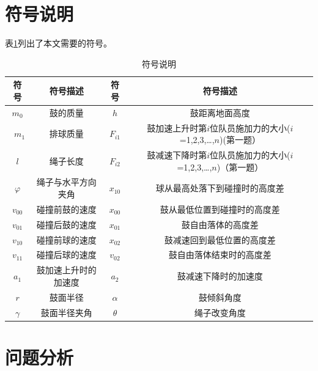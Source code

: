 \documentclass{cumcm}
\begin{document}
\section{符号说明}
表\ref{table-symbol}列出了本文需要的符号。
\begin{table}[H]
  \centering
  \caption{符号说明}\label{table-symbol}
  \begin{tabular*}{\textwidth}{c|c|c|c}
  \hline
  符号 & 符号描述 & 符号 & 符号描述\\
  \hline
  $m_0$ & 鼓的质量 & $h$ & 鼓距离地面高度\\\
  $m_1$ & 排球质量 & $F_{i1}$ & 鼓加速上升时第$i$位队员施加力的大小($i$=1,2,3,\dots,$n$)(第一题）\\
  $l$ & 绳子长度& $F_{i2}$ & 鼓减速下降时第$i$位队员施加力的大小($i$=1,2,3,\dots,$n$)（第一题）\\
  $\varphi$ & 绳子与水平方向夹角 & $x_{10}$ & 球从最高处落下到碰撞时的高度差\\
  $v_{00}$ & 碰撞前鼓的速度 &  $x_{00}$ & 鼓从最低位置到碰撞时的高度差\\
  $v_{01}$ & 碰撞后鼓的速度 &  $x_{01}$ & 鼓自由落体的高度差\\
  $v_{10}$ & 碰撞前球的速度 & $x_{02}$ & 鼓减速回到最低位置的高度差\\
  $v_{11}$ & 碰撞后球的速度 & $v_{02}$ & 鼓自由落体结束时的高度差\\
  $a_1$ & 鼓加速上升时的加速度 & $a_2$ & 鼓减速下降时的加速度\\
  $r$ & 鼓面半径 & $\alpha$ & 鼓倾斜角度\\
  $\gamma$ & 鼓面半径夹角 & $\theta$ & 绳子改变角度\\
  \hline
  \end{tabular*}
\end{table}


\section{问题分析}
\end{document}
